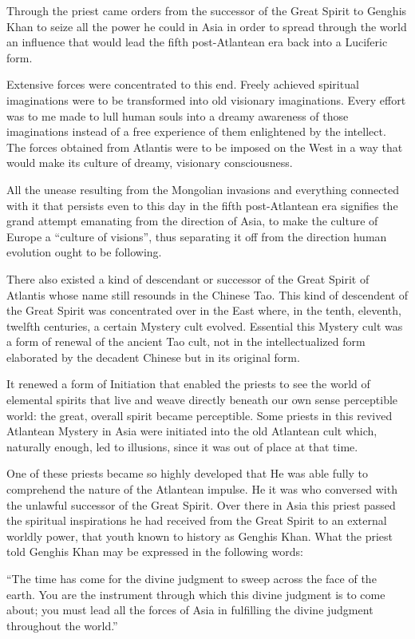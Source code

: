 Through the priest came orders from the successor of the Great Spirit to Genghis Khan to seize all the power he could in Asia in order to spread through the world an influence that would lead the fifth post-Atlantean era back into a Luciferic form.

Extensive forces were concentrated to this end. Freely achieved spiritual imaginations were to be transformed into old visionary imaginations. Every effort was to me made to lull human souls into a dreamy awareness of those imaginations instead of a free experience of them enlightened by the intellect. The forces obtained from Atlantis were to be imposed on the West in a way that would make its culture of dreamy, visionary consciousness.

All the unease resulting from the Mongolian invasions and everything connected with it that persists even to this day in the fifth post-Atlantean era signifies the grand attempt emanating from the direction of Asia, to make the culture of Europe a ``culture of visions'', thus separating it off from the direction human evolution ought to be following.

There also existed a kind of descendant or successor of the Great Spirit of Atlantis whose name still resounds in the Chinese Tao. This kind of descendent of the Great Spirit was concentrated over in the East where, in the tenth, eleventh, twelfth centuries, a certain Mystery cult evolved. Essential this Mystery cult was a form of renewal of the ancient Tao cult, not in the intellectualized form elaborated by the decadent Chinese but in its original form.

It renewed a form of Initiation that enabled the priests to see the world of elemental spirits that live and weave directly beneath our own sense perceptible world: the great, overall spirit became perceptible. Some priests in this revived Atlantean Mystery in Asia were initiated into the old Atlantean cult which, naturally enough, led to illusions, since it was out of place at that time.

One of these priests became so highly developed that He was able fully to comprehend the nature of the Atlantean impulse. He it was who conversed with the unlawful successor of the Great Spirit. Over there in Asia this priest passed the spiritual inspirations he had received from the Great Spirit to an external worldly power, that youth known to history as Genghis Khan. What the priest told Genghis Khan may be expressed in the following words:

``The time has come for the divine judgment to sweep across the face of the earth. You are the instrument through which this divine judgment is to come about; you must lead all the forces of Asia in fulfilling the divine judgment throughout the world.''

